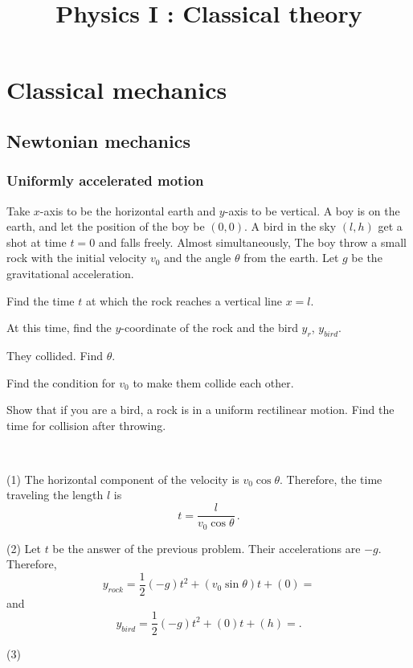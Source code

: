 \documentclass{../prb}
\title{Physics I : Classical theory}
\begin{document}
\maketitle
\tableofcontents


\chapter{Classical mechanics}


\section{Newtonian mechanics}


\subsection*{Uniformly accelerated motion}

\begin{prb}
Take $x$-axis to be the horizontal earth and $y$-axis to be vertical.
A boy is on the earth, and let the position of the boy be $(0,0)$.
A bird in the sky $(l,h)$ get a shot at time $t=0$ and falls freely.
Almost simultaneously, The boy throw a small rock with the initial velocity $v_0$ and the angle $\theta$ from the earth.
Let $g$ be the gravitational acceleration.
\begin{cond}
\item Find the time $t$ at which the rock reaches a vertical line $x=l$.
\item At this time, find the $y$-coordinate of the rock and the bird $y_r$, $y_{bird}$.
\item They collided. Find $\theta$.
\item Find the condition for $v_0$ to make them collide each other.
\item Show that if you are a bird, a rock is in a uniform rectilinear motion. Find the time for collision after throwing.
\end{cond}
\end{prb}
\begin{sol}\ \par
(1)
The horizontal component of the velocity is $v_0\cos\theta$.
Therefore, the time traveling the length $l$ is
\[t=\boxed{\frac l{v_0\cos\theta}}\,.\]

(2)
Let $t$ be the answer of the previous problem.
Their accelerations are $-g$.
Therefore,
\[y_{rock}=\frac12(-g)t^2+(v_0\sin\theta)t+(0)=\]
and
\[y_{bird}=\frac12(-g)t^2+(0)t+(h)=.\]

(3)

\end{sol}
\end{document}

